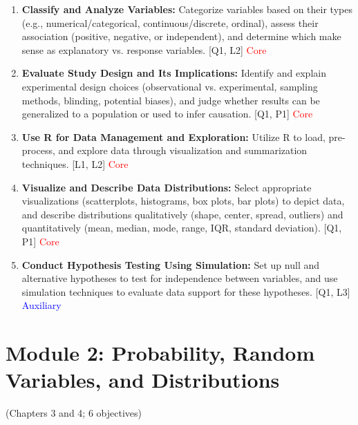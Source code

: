 \documentclass[12pt]{article}
\begin{document}

\begin{enumerate}
    \item \textbf{Classify and Analyze Variables:} Categorize variables based on their types (e.g., numerical/categorical, continuous/discrete, ordinal), assess their association (positive, negative, or independent), and determine which make sense as explanatory vs. response variables. [Q1, L2] \textcolor{red}{Core}
    \item \textbf{Evaluate Study Design and Its Implications:} Identify and explain experimental design choices (observational vs. experimental, sampling methods, blinding, potential biases), and judge whether results can be generalized to a population or used to infer causation. [Q1, P1] \textcolor{red}{Core}
    \item \textbf{Use R for Data Management and Exploration:} Utilize R to load, pre-process, and explore data through visualization and summarization techniques. [L1, L2] \textcolor{red}{Core}
    \item \textbf{Visualize and Describe Data Distributions:} Select appropriate visualizations (scatterplots, histograms, box plots, bar plots) to depict data, and describe distributions qualitatively (shape, center, spread, outliers) and quantitatively (mean, median, mode, range, IQR, standard deviation). [Q1, P1] \textcolor{red}{Core}
    \item \textbf{Conduct Hypothesis Testing Using Simulation:} Set up null and alternative hypotheses to test for independence between variables, and use simulation techniques to evaluate data support for these hypotheses. [Q1, L3] \textcolor{blue}{Auxiliary}
\end{enumerate}

\newpage


\section{Module 2: Probability, Random Variables, and Distributions}
(Chapters 3 and 4; 6 objectives)

\end{document}
